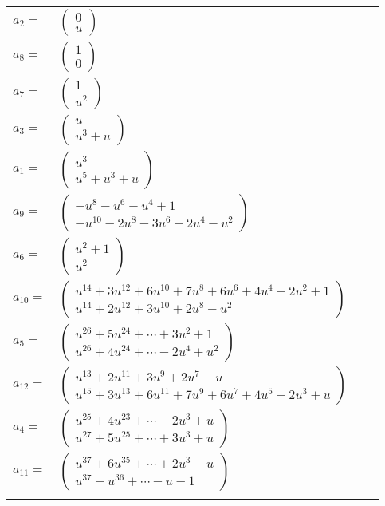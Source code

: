 \documentclass[1p]{elsarticle_modified}
\theoremstyle{definition}
\begin{document}
\begin{tabular}{m{7pt} m{180pt} m{7pt} m{180pt} }
\flushright $a_{2}=$&$\begin{pmatrix}0\\u\end{pmatrix}$ \\
\flushright $a_{8}=$&$\begin{pmatrix}1\\0\end{pmatrix}$ \\
\flushright $a_{7}=$&$\begin{pmatrix}1\\u^2\end{pmatrix}$ \\
\flushright $a_{3}=$&$\begin{pmatrix}u\\u^3+u\end{pmatrix}$ \\
\flushright $a_{1}=$&$\begin{pmatrix}u^3\\u^5+u^3+u\end{pmatrix}$ \\
\flushright $a_{9}=$&$\begin{pmatrix}- u^8- u^6- u^4+1\\- u^{10}-2 u^8-3 u^6-2 u^4- u^2\end{pmatrix}$ \\
\flushright $a_{6}=$&$\begin{pmatrix}u^2+1\\u^2\end{pmatrix}$ \\
\flushright $a_{10}=$&$\begin{pmatrix}u^{14}+3 u^{12}+6 u^{10}+7 u^8+6 u^6+4 u^4+2 u^2+1\\u^{14}+2 u^{12}+3 u^{10}+2 u^8- u^2\end{pmatrix}$ \\
\flushright $a_{5}=$&$\begin{pmatrix}u^{26}+5 u^{24}+\cdots+3 u^2+1\\u^{26}+4 u^{24}+\cdots-2 u^4+u^2\end{pmatrix}$ \\
\flushright $a_{12}=$&$\begin{pmatrix}u^{13}+2 u^{11}+3 u^9+2 u^7- u\\u^{15}+3 u^{13}+6 u^{11}+7 u^9+6 u^7+4 u^5+2 u^3+u\end{pmatrix}$ \\
\flushright $a_{4}=$&$\begin{pmatrix}u^{25}+4 u^{23}+\cdots-2 u^3+u\\u^{27}+5 u^{25}+\cdots+3 u^3+u\end{pmatrix}$ \\
\flushright $a_{11}=$&$\begin{pmatrix}u^{37}+6 u^{35}+\cdots+2 u^3- u\\u^{37}- u^{36}+\cdots- u-1\end{pmatrix}$\\&\end{tabular}
\end{document}
